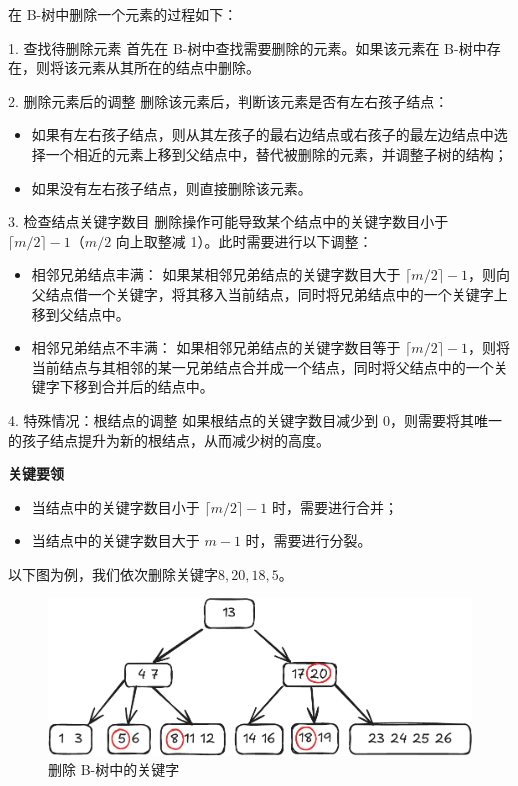 \documentclass[lang=cn,newtx,10pt,scheme=chinese]{elegantbook}
\begin{document}
在 B-树中删除一个元素的过程如下：

1. 查找待删除元素  
   首先在 B-树中查找需要删除的元素。如果该元素在 B-树中存在，则将该元素从其所在的结点中删除。

2. 删除元素后的调整  
   删除该元素后，判断该元素是否有左右孩子结点：
   \begin{itemize}
     \item 如果有左右孩子结点，则从其左孩子的最右边结点或右孩子的最左边结点中选择一个相近的元素上移到父结点中，替代被删除的元素，并调整子树的结构；
     \item 如果没有左右孩子结点，则直接删除该元素。
   \end{itemize}

3. 检查结点关键字数目  
   删除操作可能导致某个结点中的关键字数目小于 $\lceil m/2 \rceil - 1$（$m/2$ 向上取整减 1）。此时需要进行以下调整：
   \begin{itemize}
     \item 相邻兄弟结点丰满：  
       如果某相邻兄弟结点的关键字数目大于 $\lceil m/2 \rceil - 1$，则向父结点借一个关键字，将其移入当前结点，同时将兄弟结点中的一个关键字上移到父结点中。
     \item 相邻兄弟结点不丰满：  
       如果相邻兄弟结点的关键字数目等于 $\lceil m/2 \rceil - 1$，则将当前结点与其相邻的某一兄弟结点合并成一个结点，同时将父结点中的一个关键字下移到合并后的结点中。
   \end{itemize}

4. 特殊情况：根结点的调整  
   如果根结点的关键字数目减少到 0，则需要将其唯一的孩子结点提升为新的根结点，从而减少树的高度。


\textbf{关键要领}  

\begin{itemize}
  \item 当结点中的关键字数目小于 $\lceil m/2 \rceil - 1$ 时，需要进行合并；
  \item 当结点中的关键字数目大于 $m-1$ 时，需要进行分裂。
\end{itemize}

以下图为例，我们依次删除关键字$8,20,18,5$。

\begin{figure}[h!]
  \centering
  \includegraphics[width=1\textwidth]{./figure/pdf/cropped/Btree_del1.pdf}
  \caption{删除 B-树中的关键字}
  \label{fig:Btree_delete}

  \end{figure}
\end{document}
